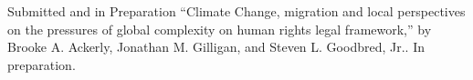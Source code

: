 %
%
\begin{rubric}{Submitted and in Preparation}%
\prefix{\textbullet}%
%
\entry* ``Climate Change, migration and local perspectives on the pressures of global complexity on human rights legal framework,'' by Brooke A. Ackerly, Jonathan M. Gilligan, and Steven L. Goodbred, Jr.. In preparation.
\end{rubric}%